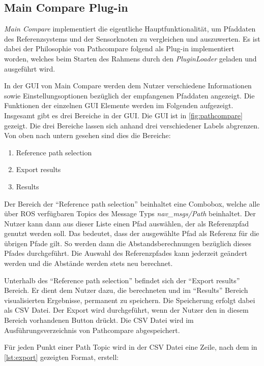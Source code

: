 \subsection{Main Compare Plug-in}
\label{sub:maincompare}


\textit{Main Compare} implementiert die eigentliche Hauptfunktionalität, um Pfaddaten des
Referenzsystems und der Sensorknoten zu vergleichen und auszuwerten. 
Es ist dabei der Philosophie von Pathcompare folgend als Plug-in
implementiert worden, welches beim Starten des Rahmens durch den
\textit{PluginLoader} geladen und ausgeführt wird.

In der GUI von Main Compare werden dem Nutzer verschiedene Informationen sowie
Einstellungsoptionen bezüglich der
empfangenen Pfaddaten angezeigt. Die Funktionen der einzelnen GUI Elemente
werden im Folgenden aufgezeigt.
Insgesamt gibt es drei Bereiche in der GUI. Die GUI ist in
\autoref{fig:pathcompare} gezeigt. Die drei Bereiche lassen sich anhand drei
verschiedener Labels abgrenzen. Von oben nach untern gesehen sind
dies die Bereiche:

\begin{enumerate}
  \item Reference path selection
  \item Export results
  \item Results
\end{enumerate}


Der Bereich der ``Reference path selection'' beinhaltet eine Combobox, welche
alle über ROS verfügbaren Topics des Message Typs \textit{nav\_msgs/Path} beinhaltet.
Der Nutzer kann dann aus dieser Liste einen Pfad auswählen, der als
Referenzpfad genutzt werden soll. Das bedeutet, dass der ausgewählte Pfad als
Referenz für die übrigen Pfade gilt. So werden dann die Abstandsberechnungen
bezüglich dieses Pfades durchgeführt. Die Auswahl des Referenzpfades kann
jederzeit geändert werden und die Abstände werden stets neu berechnet.

Unterhalb des ``Reference path selection'' befindet sich der ``Export
results'' Bereich. Er dient dem Nutzer dazu, die berechneten und
im ``Results'' Bereich visualisierten Ergebnisse, permanent zu speichern.
Die Speicherung erfolgt dabei als \gls{CSV} Datei. Der Export wird
durchgeführt, wenn der Nutzer den in diesem Bereich vorhandenen Button drückt. 
Die CSV Datei wird im Ausführungsverzeichnis von Pathcompare abgespeichert.

Für jeden Punkt einer Path Topic wird in der CSV Datei eine Zeile, nach dem in
\autoref{lst:export} gezeigten Format, erstell:


